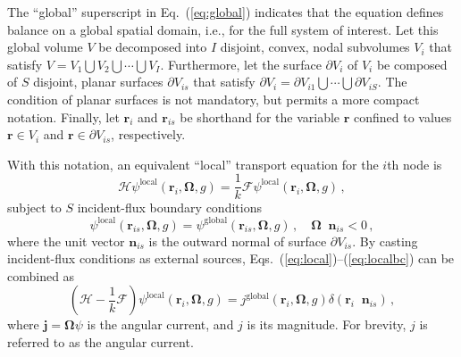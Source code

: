 \documentclass[5p,times,twocolumn,10pt]{elsarticle}
\newcommand{\oper}[1]{\mathcal{#1}}
\newcommand{\EQ}[1]{Eq.~(\ref{#1})}               %
\newcommand{\EQS}[2]{Eqs.~(\ref{#1})--(\ref{#2})}            %
\DeclareMathOperator*{\dotp}{{\scriptscriptstyle \stackrel{\bullet}{{}}}}
\begin{document}
  The ``global'' superscript 
  in \EQ{eq:global}
  indicates that the equation defines balance on a global spatial domain, i.e., 
  for the full system of interest.
  Let this global volume $V$ be decomposed into $I$ disjoint, convex,
  nodal subvolumes $V_i$  that satisfy 
  $V = V_1 \bigcup V_2 \bigcup \cdots \bigcup V_I$. 
  Furthermore, let the surface $\partial V_i$ of $V_i$ be composed of
  $S$ disjoint, planar surfaces $\partial V_{is}$ that satisfy
  $\partial V_i = \partial V_{i1} \bigcup \cdots \bigcup \partial V_{iS}$. 
  The condition of planar surfaces is not mandatory, but permits
  a more compact notation.  Finally, let $\mathbf{r}_i$ and $\mathbf{r}_{is}$
  be shorthand for the variable $\mathbf{r}$ confined to 
  values $\mathbf{r}\in V_i$ and 
  $\mathbf{r} \in \partial V_{is}$, respectively. 
  
  With this notation, an 
  equivalent ``local'' transport 
  equation for the $i$th node is
  \begin{equation}
    \oper{H}\psi^{\mathrm{local}}(\mathbf{r}_i,\bm{\Omega},g) = 
    \frac{1}{k} \oper{F} \psi^{\mathrm{local}}(\mathbf{r}_i,\bm{\Omega},g) \, ,
    \label{eq:local}
  \end{equation}
  subject to  $S$  incident-flux boundary conditions 
  \begin{equation}
    \psi^{\mathrm{local}}(\mathbf{r}_{is}, \bm{\Omega}, g) = 
    \psi^{\mathrm{global}}(\mathbf{r}_{is},\bm{\Omega}, g) \, ,
    \quad \bm{\Omega} \dotp \mathbf{n}_{is} < 0 \, ,
    \label{eq:localbc}
  \end{equation}  
  where the unit vector $\mathbf{n}_{is}$ is the
  outward normal of surface $\partial V_{is}$.
  By casting incident-flux conditions as 
  external sources, \EQS{eq:local}{eq:localbc} can 
  be combined as 
  \begin{equation}
    \left ( \oper{H} - \frac{1}{k} \oper{F} \right )\psi^{\mathrm{local}}(\mathbf{r}_i,\bm{\Omega},g) = 
    j^{\mathrm{global}}(\mathbf{r}_i, \bm{\Omega},g) 
    \delta(\mathbf{r}_i \dotp \mathbf{n}_{is}) \, ,  
    \label{eq:localcombined}
  \end{equation}
  where $\mathbf{j} = \bm{\Omega} \psi$ is the angular current, and $j$ 
  is its magnitude.  For brevity, $j$ is referred to as the 
  angular current. 
  
\end{document}
